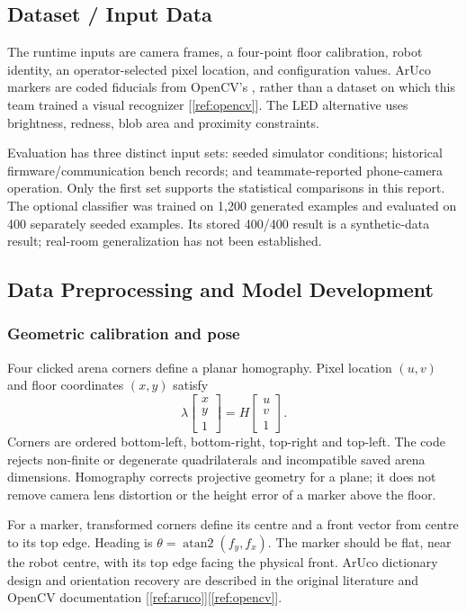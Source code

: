 \documentclass[11pt,a4paper]{article}
\newcommand{\citesrc}[1]{[\ref{ref:#1}]}
\newcommand{\code}[1]{\texttt{\detokenize{#1}}}
\begin{document}
\subsection{Dataset / Input Data}
The runtime inputs are camera frames, a four-point floor calibration, robot
identity, an operator-selected pixel location, and configuration values. ArUco
markers are coded fiducials from OpenCV's \code{DICT_4X4_50}, rather than a dataset
on which this team trained a visual recognizer \citesrc{opencv}. The LED alternative
uses brightness, redness, blob area and proximity constraints.

Evaluation has three distinct input sets: seeded simulator conditions; historical
firmware/communication bench records; and teammate-reported phone-camera operation.
Only the first set supports the statistical comparisons in this report. The
optional classifier was trained on 1,200 generated examples and evaluated on 400
separately seeded examples. Its stored 400/400 result is a synthetic-data result;
real-room generalization has not been established.

\subsection{Data Preprocessing and Model Development}
\subsubsection*{Geometric calibration and pose}
Four clicked arena corners define a planar homography. Pixel location $(u,v)$ and
floor coordinates $(x,y)$ satisfy
\begin{equation}
\lambda\begin{bmatrix}x\\y\\1\end{bmatrix}
=H\begin{bmatrix}u\\v\\1\end{bmatrix}.
\end{equation}
Corners are ordered bottom-left, bottom-right, top-right and top-left. The code
rejects non-finite or degenerate quadrilaterals and incompatible saved arena
dimensions. Homography corrects projective geometry for a plane; it does not remove
camera lens distortion or the height error of a marker above the floor.

For a marker, transformed corners define its centre and a front vector from centre
to its top edge. Heading is $\theta=\operatorname{atan2}(f_y,f_x)$. The marker should
be flat, near the robot centre, with its top edge facing the physical front. ArUco
dictionary design and orientation recovery are described in the original literature
and OpenCV documentation \citesrc{aruco}\citesrc{opencv}.
\end{document}
